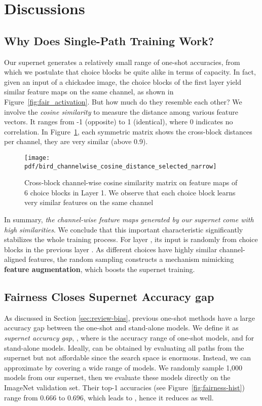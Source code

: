 \documentclass[10pt,twocolumn,letterpaper]{article}
\theoremstyle{definition}
\begin{document}
\section{Discussions}
\subsection{Why Does Single-Path Training Work?}


Our supernet generates a relatively small range of one-shot accuracies, from which we postulate that choice blocks be quite alike in terms of capacity. In fact, given an input of a chickadee image, the choice blocks of the first layer yield similar feature maps on the same channel, as shown in Figure~\ref{fig:fair_activation}.  But how much do they resemble each other? We involve the \emph{cosine similarity} \cite{nguyen2010cosine} to measure the distance among various feature vectors. It ranges from -1 (opposite)  to 1 (identical), where 0 indicates no correlation. In Figure~\ref{fig:bird_channelwise_cosine_distance_selected}, each  symmetric matrix shows the cross-block distances per channel, they are very similar (above 0.9). 




\begin{figure}[ht]
\centering
\texttt{[image: pdf/bird\_channelwise\_cosine\_distance\_selected\_narrow]}
\caption{Cross-block channel-wise cosine similarity matrix on feature maps of 6 choice blocks in Layer 1. We observe that each choice block learns very similar features on the same channel}
\label{fig:bird_channelwise_cosine_distance_selected}
\end{figure}

In summary, \emph{the channel-wise feature maps generated by our supernet come with high similarities}. We conclude that this important characteristic significantly stabilizes the whole training process. For layer , its input is randomly from choice blocks in the previous layer . As different choices have highly similar channel-aligned features, the random sampling constructs a mechanism mimicking  \textbf{feature augmentation}, which boosts the supernet training. 

\subsection{Fairness Closes Supernet Accuracy gap} 
As discussed in Section \ref{sec:review-bias}, previous one-shot methods \cite{brock2017smash,bender2018understanding} have a large accuracy gap between the one-shot and stand-alone models. We define it as \emph{supernet accuracy gap}, ,
where  is the accuracy range of one-shot models, and  for stand-alone models. Ideally,  can be obtained by evaluating all paths from the supernet but not affordable since the search space is enormous. Instead, we can approximate  by covering a wide range of models. We randomly sample 1,000 models from our supernet, then we evaluate these models directly on the ImageNet validation set. Their top-1 accuracies (see Figure~\ref{fig:fairness-hist}) range from 0.666 to 0.696, which leads to , hence it reduces  as well. 
\end{document}
